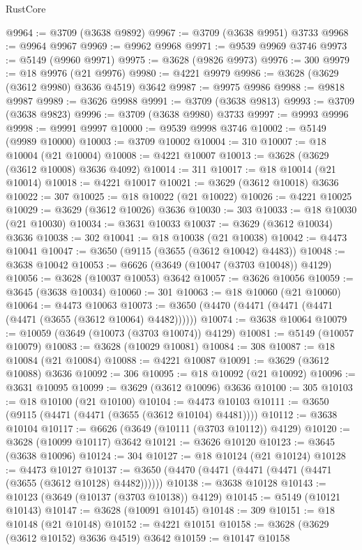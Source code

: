 \begin{lexlean}{RustCore}
\begin{coremodule}
@9964 := @3709 (@3638 @9892)
@9967 := @3709 (@3638 @9951) @3733
@9968 := @9964 @9967
@9969 := @9962 @9968
@9971 := @9539 @9969 @3746
@9973 := @5149 (@9960 @9971)
@9975 := @3628 (@9826 @9973)
@9976 := 300
@9979 := @18 @9976 (@21 @9976)
@9980 := @4221 @9979
@9986 := @3628 (@3629 (@3612 @9980) @3636 @4519) @3642
@9987 := @9975 @9986
@9988 := @9818 @9987
@9989 := @3626 @9988
@9991 := @3709 (@3638 @9813)
@9993 := @3709 (@3638 @9823)
@9996 := @3709 (@3638 @9980) @3733
@9997 := @9993 @9996
@9998 := @9991 @9997
@10000 := @9539 @9998 @3746
@10002 := @5149 (@9989 @10000)
@10003 := @3709 @10002
@10004 := 310
@10007 := @18 @10004 (@21 @10004)
@10008 := @4221 @10007
@10013 := @3628 (@3629 (@3612 @10008) @3636 @4092)
@10014 := 311
@10017 := @18 @10014 (@21 @10014)
@10018 := @4221 @10017
@10021 := @3629 (@3612 @10018) @3636
@10022 := 307
@10025 := @18 @10022 (@21 @10022)
@10026 := @4221 @10025
@10029 := @3629 (@3612 @10026) @3636
@10030 := 303
@10033 := @18 @10030 (@21 @10030)
@10034 := @3631 @10033
@10037 := @3629 (@3612 @10034) @3636
@10038 := 302
@10041 := @18 @10038 (@21 @10038)
@10042 := @4473 @10041
@10047 := @3650 (@9115 (@3655 (@3612 @10042) @4483))
@10048 := @3638 @10042
@10053 := @6626 (@3649 (@10047 (@3703 @10048)) @4129)
@10056 := @3628 (@10037 @10053) @3642
@10057 := @3626 @10056
@10059 := @3645 (@3638 @10034)
@10060 := 301
@10063 := @18 @10060 (@21 @10060)
@10064 := @4473 @10063
@10073 := @3650 (@4470 (@4471 (@4471 (@4471 (@4471 (@3655 (@3612 @10064) @4482))))))
@10074 := @3638 @10064
@10079 := @10059 (@3649 (@10073 (@3703 @10074)) @4129)
@10081 := @5149 (@10057 @10079)
@10083 := @3628 (@10029 @10081)
@10084 := 308
@10087 := @18 @10084 (@21 @10084)
@10088 := @4221 @10087
@10091 := @3629 (@3612 @10088) @3636
@10092 := 306
@10095 := @18 @10092 (@21 @10092)
@10096 := @3631 @10095
@10099 := @3629 (@3612 @10096) @3636
@10100 := 305
@10103 := @18 @10100 (@21 @10100)
@10104 := @4473 @10103
@10111 := @3650 (@9115 (@4471 (@4471 (@3655 (@3612 @10104) @4481))))
@10112 := @3638 @10104
@10117 := @6626 (@3649 (@10111 (@3703 @10112)) @4129)
@10120 := @3628 (@10099 @10117) @3642
@10121 := @3626 @10120
@10123 := @3645 (@3638 @10096)
@10124 := 304
@10127 := @18 @10124 (@21 @10124)
@10128 := @4473 @10127
@10137 := @3650 (@4470 (@4471 (@4471 (@4471 (@4471 (@3655 (@3612 @10128) @4482))))))
@10138 := @3638 @10128
@10143 := @10123 (@3649 (@10137 (@3703 @10138)) @4129)
@10145 := @5149 (@10121 @10143)
@10147 := @3628 (@10091 @10145)
@10148 := 309
@10151 := @18 @10148 (@21 @10148)
@10152 := @4221 @10151
@10158 := @3628 (@3629 (@3612 @10152) @3636 @4519) @3642
@10159 := @10147 @10158

\end{coremodule}
\end{lexlean}
